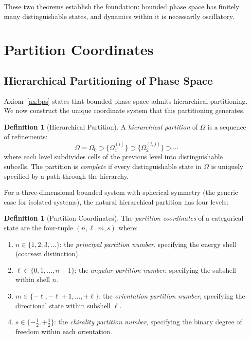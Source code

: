 \documentclass[twocolumn,10pt,a4paper]{article}
\theoremstyle{plain}
\theoremstyle{definition}
\newtheorem{definition}[theorem]{Definition}
\theoremstyle{remark}
\begin{document}
These two theorems establish the foundation: bounded phase space has finitely many distinguishable states, and dynamics within it is necessarily oscillatory.

\section{Partition Coordinates}
\label{sec:coordinates}

\subsection{Hierarchical Partitioning of Phase Space}

Axiom~\ref{ax:bps} states that bounded phase space admits hierarchical partitioning. We now construct the unique coordinate system that this partitioning generates.

\begin{definition}[Hierarchical Partition]
\label{def:partition}
A \emph{hierarchical partition} of $\Omega$ is a sequence of refinements:
\begin{equation}
    \Omega = \Omega_0 \supset \{\Omega_1^{(i)}\} \supset \{\Omega_2^{(i,j)}\} \supset \cdots
\end{equation}
where each level subdivides cells of the previous level into distinguishable subcells. The partition is \emph{complete} if every distinguishable state in $\Omega$ is uniquely specified by a path through the hierarchy.
\end{definition}

For a three-dimensional bounded system with spherical symmetry (the generic case for isolated systems), the natural hierarchical partition has four levels:

\begin{definition}[Partition Coordinates]
\label{def:partition_coords}
The \emph{partition coordinates} of a categorical state are the four-tuple $(n, \ell, m, s)$ where:
\begin{enumerate}[label=(\roman*)]
    \item $n \in \{1, 2, 3, \ldots\}$: the \emph{principal partition number}, specifying the energy shell (coarsest distinction).
    \item $\ell \in \{0, 1, \ldots, n-1\}$: the \emph{angular partition number}, specifying the subshell within shell $n$.
    \item $m \in \{-\ell, -\ell+1, \ldots, +\ell\}$: the \emph{orientation partition number}, specifying the directional state within subshell $\ell$.
    \item $s \in \{-\tfrac{1}{2}, +\tfrac{1}{2}\}$: the \emph{chirality partition number}, specifying the binary degree of freedom within each orientation.
\end{enumerate}
\end{definition}
\end{document}
